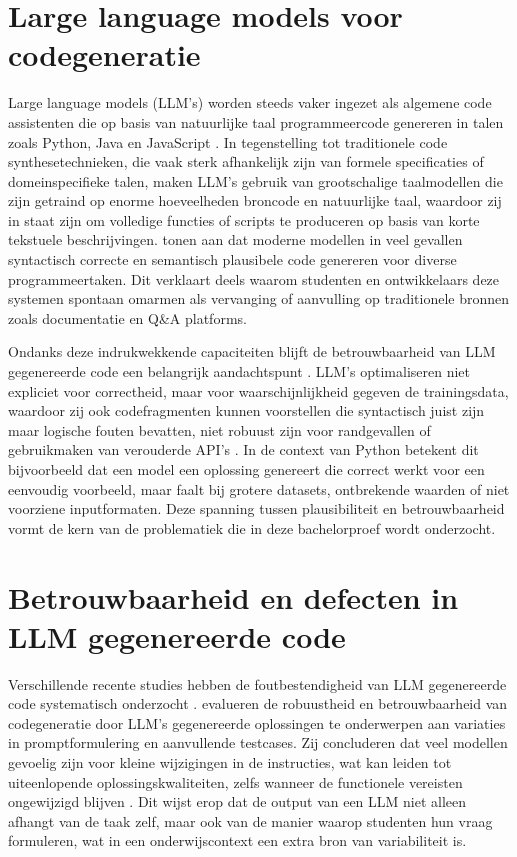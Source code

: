 \section{Large language models voor codegeneratie}

Large language models (LLM's) worden steeds vaker ingezet als algemene code assistenten die op basis van natuurlijke taal programmeercode genereren in talen zoals Python, Java en JavaScript \autocite{Li2023}. In tegenstelling tot traditionele code synthesetechnieken, die vaak sterk afhankelijk zijn van formele specificaties of domeinspecifieke talen, maken LLM's gebruik van grootschalige taalmodellen die zijn getraind op enorme hoeveelheden broncode en natuurlijke taal, waardoor zij in staat zijn om volledige functies of scripts te produceren op basis van korte tekstuele beschrijvingen. \textcite{Li2023} tonen aan dat moderne modellen in veel gevallen syntactisch correcte en semantisch plausibele code genereren voor diverse programmeertaken. Dit verklaart deels waarom studenten en ontwikkelaars deze systemen spontaan omarmen als vervanging of aanvulling op traditionele bronnen zoals documentatie en Q\&A platforms.

Ondanks deze indrukwekkende capaciteiten blijft de betrouwbaarheid van LLM gegenereerde code een belangrijk aandachtspunt \autocite{Li2023}. LLM's optimaliseren niet expliciet voor correctheid, maar voor waarschijnlijkheid gegeven de trainingsdata, waardoor zij ook codefragmenten kunnen voorstellen die syntactisch juist zijn maar logische fouten bevatten, niet robuust zijn voor randgevallen of gebruikmaken van verouderde API's \autocite{Zhang2023}. In de context van Python betekent dit bijvoorbeeld dat een model een oplossing genereert die correct werkt voor een eenvoudig voorbeeld, maar faalt bij grotere datasets, ontbrekende waarden of niet voorziene inputformaten. Deze spanning tussen plausibiliteit en betrouwbaarheid vormt de kern van de problematiek die in deze bachelorproef wordt onderzocht.


\section{Betrouwbaarheid en defecten in LLM gegenereerde code}

Verschillende recente studies hebben de foutbestendigheid van LLM gegenereerde code systematisch onderzocht \autocite{Li2023,Esfahani2024}. \textcite{Li2023} evalueren de robuustheid en betrouwbaarheid van codegeneratie door LLM's  gegenereerde oplossingen te onderwerpen aan variaties in promptformulering en aanvullende testcases. Zij concluderen dat veel modellen gevoelig zijn voor kleine wijzigingen in de instructies, wat kan leiden tot uiteenlopende oplossingskwaliteiten, zelfs wanneer de functionele vereisten ongewijzigd blijven \autocite{Li2023}. Dit wijst erop dat de output van een LLM niet alleen afhangt van de taak zelf, maar ook van de manier waarop studenten hun vraag formuleren, wat in een onderwijscontext een extra bron van variabiliteit is.

